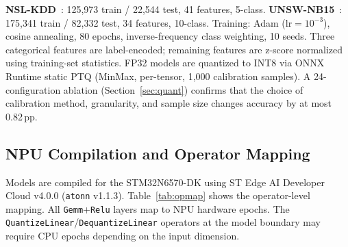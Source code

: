 \documentclass[conference]{IEEEtran}
\begin{document}
\textbf{NSL-KDD}~\cite{tavallaee2009nslkdd}: 125,973 train / 22,544 test,
41 features, 5-class.
\textbf{UNSW-NB15}~\cite{moustafa2015unsw}: 175,341 train / 82,332 test,
34 features, 10-class.
Training: Adam ($\text{lr}{=}10^{-3}$), cosine annealing, 80 epochs,
inverse-frequency class weighting, 10 seeds.
Three categorical features are label-encoded; remaining features are
z-score normalized using training-set statistics.
FP32 models are quantized to INT8 via ONNX Runtime static PTQ
(MinMax, per-tensor, 1,000 calibration samples).
A 24-configuration ablation (Section~\ref{sec:quant}) confirms that
the choice of calibration method, granularity, and sample size
changes accuracy by at most 0.82\,pp.

\subsection{NPU Compilation and Operator Mapping}

Models are compiled for the STM32N6570-DK using ST Edge AI Developer
Cloud v4.0.0 (\texttt{atonn} v1.1.3).
Table~\ref{tab:opmap} shows the operator-level mapping.
All \texttt{Gemm}+\texttt{Relu} layers map to NPU hardware epochs.
The \texttt{QuantizeLinear}/\texttt{DequantizeLinear} operators at
the model boundary may require CPU epochs depending on the input
dimension.

\begin{table}[t]
\centering
\caption{Operator mapping to NPU epochs. ReLU INT8 achieves near-100\%
NPU utilization; QCFS INT8 forces CPU fallback at every \texttt{Floor}.}
\label{tab:opmap}
\small
{}
\end{table}
\end{document}
